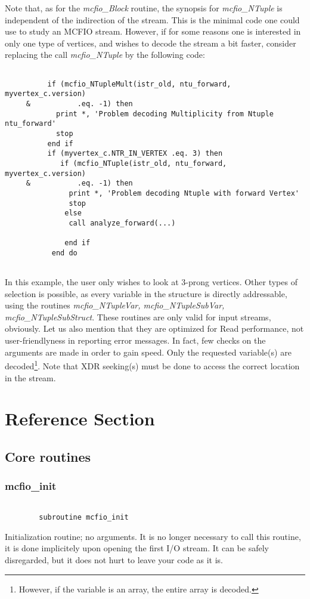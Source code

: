 	Note that, as for the {\em mcfio\_Block} routine, the synopsis for 
{\em mcfio\_NTuple} is independent of the indirection of the stream. This is 
the minimal code one could use to study an MCFIO stream.  However, if for some
reasons one is interested in only one type of vertices, and wishes to decode 
the stream a bit faster, consider replacing the call {\em mcfio\_NTuple} 
by the following code:

\begin{verbatim}

          if (mcfio_NTupleMult(istr_old, ntu_forward, myvertex_c.version)
     &           .eq. -1) then 
            print *, 'Problem decoding Multiplicity from Ntuple ntu_forward'
            stop
          end if
          if (myvertex_c.NTR_IN_VERTEX .eq. 3) then
             if (mcfio_NTuple(istr_old, ntu_forward, myvertex_c.version)
     &           .eq. -1) then 
               print *, 'Problem decoding Ntuple with forward Vertex'
               stop
              else 
               call analyze_forward(...)  
          
              end if
           end do
        
\end{verbatim}

In this example, the user only wishes to look at 3-prong vertices.  Other types
of selection is possible, as every variable in the structure is  directly
addressable, using the routines {\em mcfio\_NTupleVar,   mcfio\_NTupleSubVar, 
mcfio\_NTupleSubStruct}.  These routines are only valid for input streams,
obviously. Let us also mention that they are optimized for  Read performance,
not user-friendlyness in reporting error messages.  In fact, few checks on the
arguments are made in order to gain speed. Only the  requested variable(s) are
decoded\footnote{However, if the variable is an  array, the entire array is
decoded.}.  Note that XDR seeking(s) must be done to access the correct
location in the stream. 



	  
\section{Reference Section}

\subsection{Core routines}


\subsubsection{mcfio\_init}
\begin{verbatim}

        subroutine mcfio_init

\end{verbatim}
 Initialization routine; no arguments. It is no longer necessary to call 
 this routine, it is done implicitely upon opening the first I/O stream.
 It can be safely disregarded, but it does not hurt to leave your code as 
 it is.

